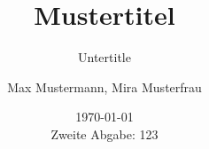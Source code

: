 \author{
	Max Mustermann,
	Mira Musterfrau
}
\titlehead{Fachbereich}
\subject{Grund der Arbeit}
\title{Mustertitel}
\subtitle{Untertitle}
\date{\today\\Zweite Abgabe: 123}
\publishers{HERAUSGEBER}

